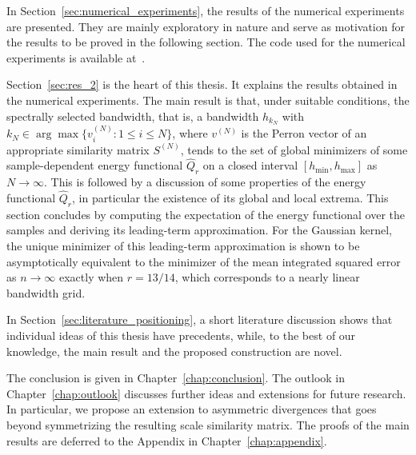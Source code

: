 In Section~\ref{sec:numerical_experiments}, the results of the numerical experiments are presented. They are mainly exploratory in nature and serve as motivation for the results to be proved in the following section. The code used for the numerical experiments is available at~\cite{sukhanov2026code}.

Section~\ref{sec:res_2} is the heart of this thesis. It explains the results obtained in the numerical experiments. The main result is that, under suitable conditions, the spectrally selected bandwidth, that is, a bandwidth $h_{k_N}$ with $k_N\in\arg\max\{v_i^{(N)}:1\le i\le N\}$, where $v^{(N)}$ is the Perron vector of an appropriate similarity matrix $S^{(N)}$, tends to the set of global minimizers of some sample-dependent energy functional $\hat{Q}_r$ on a closed interval $[h_{\min},h_{\max}]$ as $N\to\infty$. This is followed by a discussion of some properties of the energy functional $\hat{Q}_r$, in particular the existence of its global and local extrema. This section concludes by computing the expectation of the energy functional over the samples and deriving its leading-term approximation. For the Gaussian kernel, the unique minimizer of this leading-term approximation is shown to be asymptotically equivalent to the minimizer of the mean integrated squared error as $n\to\infty$ exactly when $r=13/14$, which corresponds to a nearly linear bandwidth grid.

In Section~\ref{sec:literature_positioning}, a short literature discussion shows that individual ideas of this thesis have precedents, while, to the best of our knowledge, the main result and the proposed construction are novel.

The conclusion is given in Chapter~\ref{chap:conclusion}. The outlook in Chapter~\ref{chap:outlook} discusses further ideas and extensions for future research. In particular, we propose an extension to asymmetric divergences that goes beyond symmetrizing the resulting scale similarity matrix. The proofs of the main results are deferred to the Appendix in Chapter~\ref{chap:appendix}.